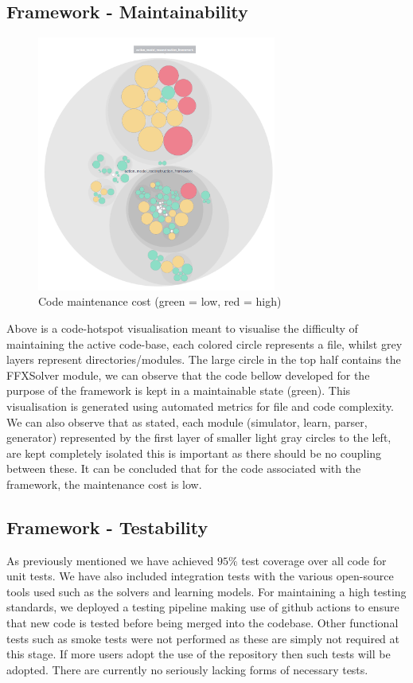 \subsection{Framework - Maintainability}
\begin{figure}[h]
 \centering
 \includegraphics[width=0.7\textwidth]{images/code/hotspot}
 \caption{Code maintenance cost (green = low, red = high)}
 \label{fig:hotspots}
\end{figure}
Above is a code-hotspot visualisation meant to visualise the difficulty of maintaining the active code-base, each colored circle represents a file, whilst grey layers represent directories/modules.
The large circle in the top half contains the FFXSolver module, we can observe that the code bellow developed for the purpose of the framework is kept in a maintainable state (green).
This visualisation is generated using automated metrics for file and code complexity.
We can also observe that as stated, each module (simulator, learn, parser, generator) represented by the first layer of smaller light gray circles to the left, are kept completely isolated this is important as there should be no coupling between these.
It can be concluded that for the code associated with the framework, the maintenance cost is low.

\subsection{Framework - Testability}
As previously mentioned we have achieved \(95\%\) test coverage over all code for unit tests.
We have also included integration tests with the various open-source tools used such as the solvers and learning models.
For maintaining a high testing standards, we deployed a testing pipeline making use of github actions to ensure that new code is tested before being merged into the codebase.
Other functional tests such as smoke tests were not performed as these are simply not required at this stage.
If more users adopt the use of the repository then such tests will be adopted.
There are currently no seriously lacking forms of necessary tests.

